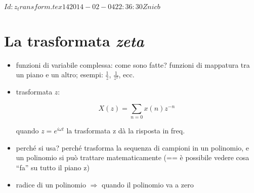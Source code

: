 %
%

\svnInfo $Id: z_transform.tex 14 2014-02-04 22:36:30Z nicb $

\section{La trasformata \emph{zeta}}

\begin{itemize}

  \item funzioni di variabile complessa: come sono fatte?
    funzioni di mappatura tra un piano e un altro;
    esempi: $\frac{1}{z}$, $\frac{1}{z^2}$, ecc.

  \item trasformata $z$:
	
		 \begin{equation}
	      X ( z ) = \sum_{n = 0}{x(n) z^{-n}}\
		 \end{equation}
		 
    quando $z = e^{i \omega t}$ la trasformata z d\`a la risposta in freq.

  \item perch\'e si usa? perch\'e trasforma la sequenza di campioni in
    un polinomio, e un polinomio si pu\`o trattare matematicamente
    (== \`e possibile vedere cosa ``fa'' su tutto il piano z)

  \item radice di un polinomio $\Rightarrow$ quando il polinomio va a zero


\end{itemize}
